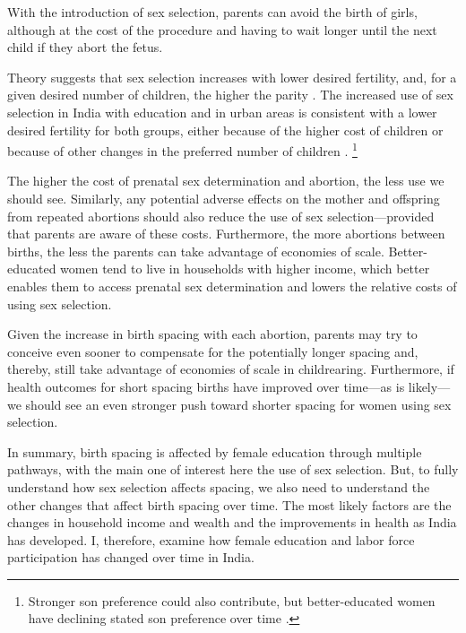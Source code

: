 With the introduction of sex selection, parents can avoid the birth of girls, 
although at the cost of the procedure and having to wait longer until 
the next child if they abort the fetus.

Theory suggests that sex selection increases with lower desired fertility, and, for a 
given desired number of children, the higher the parity \citep{Portner2015b}.
The increased use of sex selection in India with education and in urban
areas is consistent with a lower desired fertility for both groups,
either because of the higher cost of children or because of other
changes in the preferred number of children
\citep{das_gupta97,retherford03b,jha06,Guilmoto2009a,Bongaarts2013,Portner2015b,
Jayachandran2017}.%
\footnote{
Stronger son preference could also contribute, but better-educated women 
have declining stated son preference over time \citep{bhat03,pande07}.
}

The higher the cost of prenatal sex determination and abortion, the less use we should 
see.
Similarly, any potential adverse effects on the mother and offspring 
from repeated abortions should also reduce the use of sex selection---provided that 
parents are aware of these costs.
Furthermore, the more abortions between births, the less the parents can take advantage 
of economies of scale.
Better-educated women tend to live in households with higher income, which better enables 
them to access prenatal sex determination and lowers the relative costs of using sex 
selection.

Given the increase in birth spacing with each abortion, parents may try to 
conceive even sooner to compensate for the potentially longer spacing and, 
thereby, still take advantage of economies of scale in childrearing.
Furthermore, if health outcomes for short spacing births have improved over 
time---as is likely---we should see an even stronger push toward shorter 
spacing for women using sex selection.

In summary, birth spacing is affected by female education through 
multiple pathways, with the main one of interest here the use of 
sex selection. 
But, to fully understand how sex selection affects spacing, we also 
need to understand the other changes that affect birth spacing over time.
The most likely factors are the changes in household income and 
wealth and the improvements in health as India has developed.
I, therefore, examine how female education and labor force 
participation has changed over time in India.



